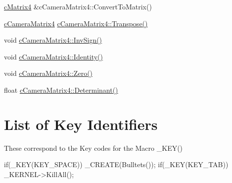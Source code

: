 \hyperlink{classc_matrix4}{cMatrix4} \&cCameraMatrix4::ConvertToMatrix() \par
 \hyperlink{classc_camera_matrix4}{cCameraMatrix4} \hyperlink{classc_camera_matrix4_ac1fa4dd9add669a8faecd0ca79713278}{cCameraMatrix4::Transpose()} \par
 void \hyperlink{classc_camera_matrix4_a97d111c444dd87ecec278e585fe058a7}{cCameraMatrix4::InvSign()} \par
 void \hyperlink{classc_camera_matrix4_a23a05c1aff8a58dc662f5b871b422c17}{cCameraMatrix4::Identity()} \par
 void \hyperlink{classc_camera_matrix4_a1ec81a7ec3274f89d2b8fb94923345c0}{cCameraMatrix4::Zero()} \par
 float \hyperlink{classc_camera_matrix4_a4f3456fc67fbd37692a8daa9d11d5fc6}{cCameraMatrix4::Determinant()} \par
\hypertarget{_reference_lists_KeyIdentifiersList}{}\section{List of Key Identifiers}\label{_reference_lists_KeyIdentifiersList}
These correspond to the Key codes for the Macro \_\-KEY() 
\begin{DoxyCode}
 if(_KEY(KEY_SPACE)) _CREATE(Bulltets());
 if(_KEY(KEY_TAB)) _KERNEL->KillAll();
\end{DoxyCode}


